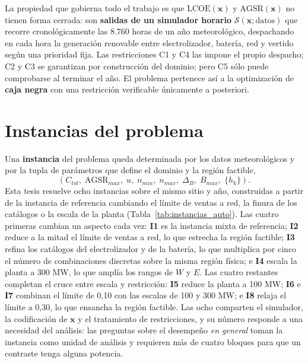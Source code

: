 La propiedad que gobierna todo el trabajo es que $\mathrm{LCOE}(\mathbf{x})$ y $\mathrm{AGSR}(\mathbf{x})$ no tienen forma cerrada: son \textbf{salidas de un simulador horario} $\mathcal{S}(\mathbf{x};\text{datos})$ que recorre cronológicamente las 8.760 horas de un año meteorológico, despachando en cada hora la generación renovable entre electrolizador, batería, red y vertido según una prioridad fija. Las restricciones C1 y C4 las impone el propio despacho; C2 y C3 se garantizan por construcción del dominio; pero C5 sólo puede comprobarse al terminar el año. El problema pertenece así a la optimización de \textbf{caja negra} con una restricción verificable únicamente a posteriori.

\section{Instancias del problema}
\label{sec:instancias}

Una \textbf{instancia} del problema queda determinada por los datos meteorológicos y por la tupla de parámetros que define el dominio y la región factible,
\begin{equation}
\left(C_{tot},\;\mathrm{AGSR}_{max},\;u,\;n_{min},\;n_{max},\;\Delta_B,\;B_{max},\;\{h_k\}\right).
\end{equation}
Esta tesis resuelve ocho instancias sobre el mismo sitio y año, construidas a partir de la instancia de referencia cambiando el límite de ventas a red, la finura de los catálogos o la escala de la planta (Tabla~\ref{tab:instancias_auto}). Las cuatro primeras cambian un aspecto cada vez: \textbf{I1} es la instancia mixta de referencia; \textbf{I2} reduce a la mitad el límite de ventas a red, lo que estrecha la región factible; \textbf{I3} refina los catálogos del electrolizador y de la batería, lo que multiplica por cinco el número de combinaciones discretas sobre la misma región física; e \textbf{I4} escala la planta a 300 MW, lo que amplía los rangos de $W$ y $E$. Las cuatro restantes completan el cruce entre escala y restricción: \textbf{I5} reduce la planta a 100 MW; \textbf{I6} e \textbf{I7} combinan el límite de 0,10 con las escalas de 100 y 300 MW; e \textbf{I8} relaja el límite a 0,30, lo que ensancha la región factible. Las ocho comparten el simulador, la codificación de $\mathbf{x}$ y el tratamiento de restricciones, y su número responde a una necesidad del análisis: las preguntas sobre el desempeño \emph{en general} toman la instancia como unidad de análisis y requieren más de cuatro bloques para que un contraste tenga alguna potencia.

